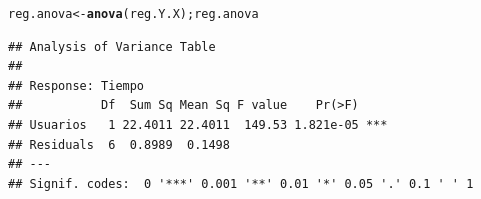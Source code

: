 \documentclass{article}\usepackage[]{graphicx}\usepackage[]{color}
\makeatletter
\newcommand{\hlstd}[1]{\textcolor[rgb]{0.345,0.345,0.345}{#1}}%
\newcommand{\hlkwb}[1]{\textcolor[rgb]{0.69,0.353,0.396}{#1}}%
\newcommand{\hlkwd}[1]{\textcolor[rgb]{0.737,0.353,0.396}{\textbf{#1}}}%
\newenvironment{kframe}{%
 \def\at@end@of@kframe{}%
 \ifinner\ifhmode%
  \def\at@end@of@kframe{\end{minipage}}%
  \begin{minipage}{\columnwidth}%
 \fi\fi%
 \def\FrameCommand##1{\hskip\@totalleftmargin \hskip-\fboxsep
 \colorbox{shadecolor}{##1}\hskip-\fboxsep
     \hskip-\linewidth \hskip-\@totalleftmargin \hskip\columnwidth}%
 \MakeFramed {\advance\hsize-\width
   \@totalleftmargin\z@ \linewidth\hsize
   \@setminipage}}%
 {\par\unskip\endMakeFramed%
 \at@end@of@kframe}
\newenvironment{knitrout}{}{} %
\makeatother
\begin{document}
\begin{knitrout}
\begin{kframe}\begin{alltt}
\hlstd{reg.anova} \hlkwb{<-} \hlkwd{anova}\hlstd{(reg.Y.X); reg.anova}
\end{alltt}
\begin{verbatim}
## Analysis of Variance Table
## 
## Response: Tiempo
##           Df  Sum Sq Mean Sq F value    Pr(>F)    
## Usuarios   1 22.4011 22.4011  149.53 1.821e-05 ***
## Residuals  6  0.8989  0.1498                      
## ---
## Signif. codes:  0 '***' 0.001 '**' 0.01 '*' 0.05 '.' 0.1 ' ' 1
\end{verbatim}
\end{kframe}
\end{knitrout}
\end{document}
